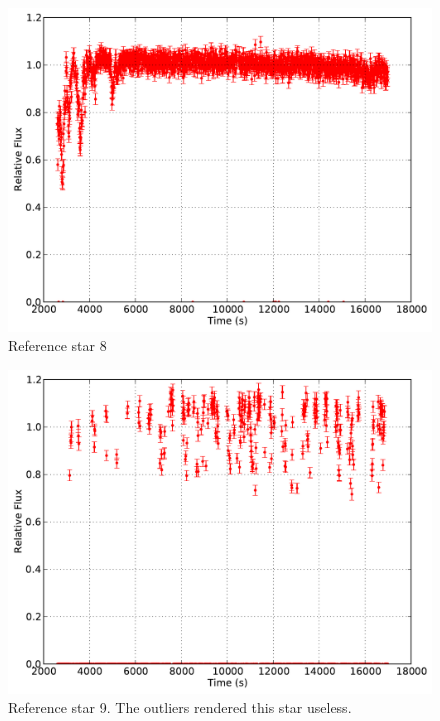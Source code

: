 \documentclass{aastex61}
\begin{document}
\begin{figure}[h]
	\centering
	\includegraphics[scale = .45]{exo_curves8.pdf}
	\caption{Reference star 8}
	\label{fig: refcurve8}
\end{figure}
\begin{figure}[h]
	\centering
	\includegraphics[scale = .45]{exo_curves9.pdf}
	\caption{Reference star 9. The outliers rendered this star useless.}
	\label{fig: refcurve9}
\end{figure}
\end{document}
